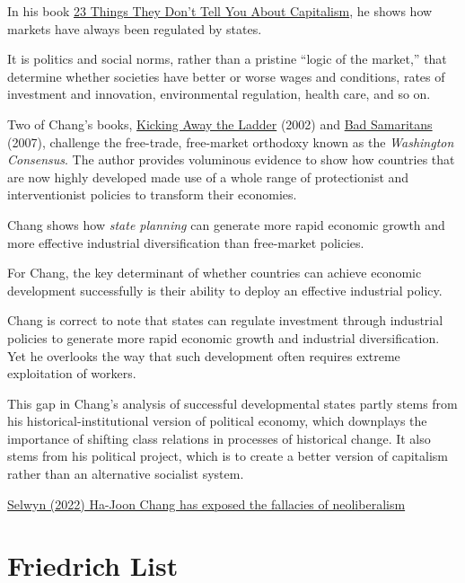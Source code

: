 \documentclass[
]{book}
\begin{document}
In his book \href{https://developingeconomics.org/2022/11/27/ha-joon-chang-has-exposed-the-fallacies-of-neoliberalism/}{23 Things They Don't Tell You About Capitalism}, he shows how markets have always been regulated by states.

It is politics and social norms, rather than a pristine ``logic of the market,'' that determine whether societies have better or worse wages and conditions, rates of investment and innovation, environmental regulation, health care, and so on.

Two of Chang's books, \href{https://anthempress.com/kicking-away-the-ladder-pb}{Kicking Away the Ladder} (2002) and \href{https://www.bloomsbury.com/us/bad-samaritans-9781596917385/}{Bad Samaritans} (2007), challenge the free-trade, free-market orthodoxy known as the \emph{Washington Consensus}. The author provides voluminous evidence to show how countries that are now highly developed made use of a whole range of protectionist and interventionist policies to transform their economies.

Chang shows how \emph{state planning} can generate more rapid economic growth and more effective industrial diversification than free-market policies.

For Chang, the key determinant of whether countries can achieve economic development successfully is their ability to deploy an effective industrial policy.

Chang is correct to note that states can regulate investment through industrial policies to generate more rapid economic growth and industrial diversification. Yet he overlooks the way that such development often requires extreme exploitation of workers.

This gap in Chang's analysis of successful developmental states partly stems from his historical-institutional version of political economy, which downplays the importance of shifting class relations in processes of historical change. It also stems from his political project, which is to create a better version of capitalism rather than an alternative socialist system.

\href{https://developingeconomics.org/2022/11/27/ha-joon-chang-has-exposed-the-fallacies-of-neoliberalism/}{Selwyn (2022) Ha-Joon Chang has exposed the fallacies of neoliberalism}

\hypertarget{friedrich-list}{%
\section{Friedrich List}\label{friedrich-list}}
\end{document}
